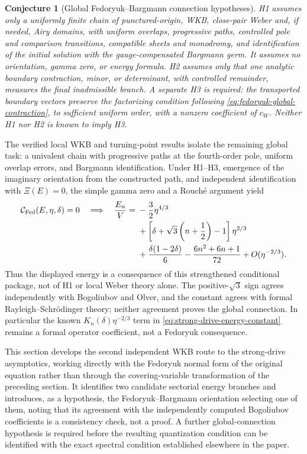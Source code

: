 \documentclass[11pt]{article}
\newtheorem{conjecture}[theorem]{Conjecture}
\theoremstyle{remark}
\begin{document}
\begin{conjecture}[Global Fedoryuk--Bargmann connection hypotheses]
\label{conj:fedoryuk-bargmann-lemma}
H1 assumes only a uniformly finite chain of punctured-origin, WKB,
close-pair Weber and, if needed, Airy domains, with uniform overlaps,
progressive paths, controlled pole and comparison transitions, compatible
sheets and monodromy, and identification of the initial solution with the
gauge-compensated Bargmann germ.  It assumes no orientation, gamma zero, or
energy formula.  H2 assumes only that one analytic boundary contraction,
minor, or determinant, with controlled remainder, measures the final
inadmissible branch.  A separate H3 is required: the transported boundary
vectors preserve the factorizing condition following
\eqref{eq:fedoryuk-global-contraction}, to sufficient uniform order, with a
nonzero coefficient of \(c_W\).  Neither H1 nor H2 is known to imply H3.
\end{conjecture}

The verified local WKB and turning-point results isolate the remaining global
task: a univalent chain with progressive paths at the fourth-order pole,
uniform overlap errors, and Bargmann identification.  Under H1--H3, emergence
of the imaginary orientation from the constructed path, and independent
identification with \(\Xi(E)=0\), the simple gamma zero and a
Rouch\'e argument yield
\begin{equation}
 \begin{aligned}
 \mathcal C_{\rm Fed}(E,\eta,\delta)=0
 \quad\Longrightarrow\quad
 \frac{E_n}{V}={}&-\frac32\eta^{4/3}\\
 &+\left[\delta+\sqrt3\left(n+\frac12\right)-1\right]\eta^{2/3}\\
 &+\frac{\delta(1-2\delta)}6-\frac{6n^2+6n+1}{72}
 +O(\eta^{-2/3}).
 \end{aligned}
 \label{eq:fedoryuk-conditional-quantization}
\end{equation}
Thus the displayed energy is a consequence of this strengthened conditional
package, not of H1 or local Weber theory alone.
The positive-\(\sqrt3\) sign agrees independently with Bogoliubov and Olver,
and the constant agrees with formal Rayleigh--Schr\"odinger theory; neither
agreement proves the global connection.  In particular the known
\(K_n(\delta)\eta^{-2/3}\) term in
\eqref{eq:strong-drive-energy-constant} remains a formal operator
coefficient, not a Fedoryuk consequence.

This section develops the second independent WKB route to the strong-drive
asymptotics, working directly with the Fedoryuk normal form of the original
equation rather than through the covering-variable transformation of the
preceding section.  It identifies two candidate sectorial energy branches
and introduces, as a hypothesis, the Fedoryuk--Bargmann orientation
selecting one of them, noting that its agreement with the independently
computed Bogoliubov coefficients is a consistency check, not a proof.  A
further global-connection hypothesis is required before the resulting
quantization condition can be identified with the exact spectral condition
established elsewhere in the paper.
\end{document}
